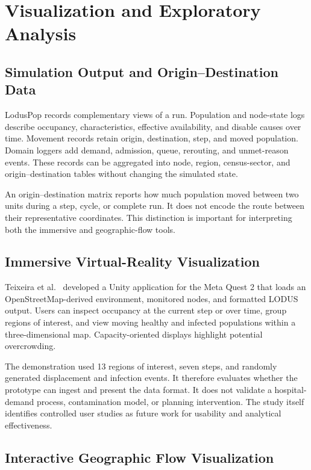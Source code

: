 \documentclass[pdflatex,sn-mathphys-num]{sn-jnl}%
\theoremstyle{thmstyleone}%
\theoremstyle{thmstyletwo}%
\theoremstyle{thmstylethree}%
\begin{document}
\section{Visualization and Exploratory Analysis}
\label{sec:visualization}

\subsection{Simulation Output and Origin--Destination Data}

LodusPop records complementary views of a run. Population and node-state logs describe occupancy, characteristics, effective availability, and disable causes over time. Movement records retain origin, destination, step, and moved population. Domain loggers add demand, admission, queue, rerouting, and unmet-reason events. These records can be aggregated into node, region, census-sector, and origin--destination tables without changing the simulated state.

An origin--destination matrix reports how much population moved between two units during a step, cycle, or complete run. It does not encode the route between their representative coordinates. This distinction is important for interpreting both the immersive and geographic-flow tools.

\subsection{Immersive Virtual-Reality Visualization}

Teixeira et al.~\citep{teixeira2024visualization} developed a Unity application for the Meta Quest 2 that loads an OpenStreetMap-derived environment, monitored nodes, and formatted LODUS output. Users can inspect occupancy at the current step or over time, group regions of interest, and view moving healthy and infected populations within a three-dimensional map. Capacity-oriented displays highlight potential overcrowding.

The demonstration used 13 regions of interest, seven steps, and randomly generated displacement and infection events. It therefore evaluates whether the prototype can ingest and present the data format. It does not validate a hospital-demand process, contamination model, or planning intervention. The study itself identifies controlled user studies as future work for usability and analytical effectiveness.

\subsection{Interactive Geographic Flow Visualization}
\end{document}

